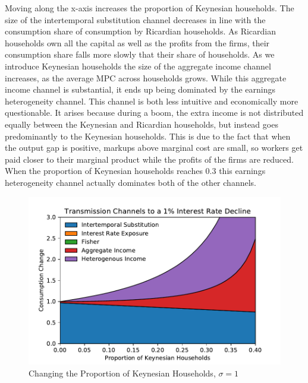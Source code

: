 \documentclass[12pt,a4paper]{article}
\begin{document}
Moving along the x-axis increases the proportion of Keynesian households. The size of the intertemporal substitution channel decreases in line with the consumption share of consumption by Ricardian households. As Ricardian households own all the capital as well as the profits from the firms, their consumption share falls more slowly that their share of households. As we introduce Keynesian households the size of the aggregate income channel increases, as the average MPC across households grows. While this aggregate income channel is substantial, it ends up being dominated by the earnings heterogeneity channel. This channel is both less intuitive and economically more questionable. It arises because during a boom, the extra income is not distributed equally between the Keynesian and Ricardian households, but instead goes predominantly to the Keynesian households. This is due to the fact that when the output gap is positive, markups above marginal cost are small, so workers get paid closer to their marginal product while the profits of the firms are reduced. When the proportion of Keynesian households reaches 0.3 this earnings heterogeneity channel actually dominates both of the other channels.

\begin{figure} 
	\begin{centering}
		\includegraphics[scale=0.7]{../Python/DoloCode/Figures/ProportionKeynesian_sigma1.pdf}
		\caption{Changing the Proportion of Keynesian Households, $\sigma=1$}
		\label{fig:ProportionKeynesian}
	\end{centering}
\end{figure}
\end{document}

